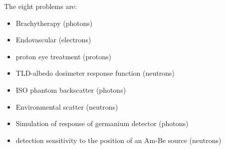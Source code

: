 \documentclass[12pt]{article}
\begin{document}
\begin{enumerate}
The eight problems are: 
\begin{itemize}
\item Brachytherapy (photons)
\item Endovascular (electrons)
\item proton eye treatment (protons)
\item TLD-albedo dosimeter response function (neutrons)
\item ISO phantom backscatter (photons)
\item Environmental scatter (neutrons)
\item Simulation of response of germanium detector (photons)
\item detection sensitivity to the position of an Am-Be source (neutrons)
\end{itemize}	
\end{enumerate}
\end{document}
